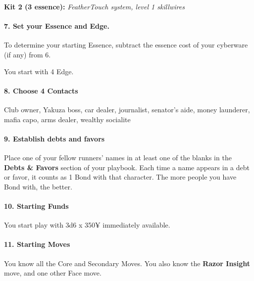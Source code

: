 \begin{multicols}{3}
\textbf{Kit 2 (3 essence):} \textit{FeatherTouch system, level
1 skillwires}


\paragraph{7.  Set your Essence and Edge.}

To determine your starting Essence, subtract the
essence cost of your cyberware (if any) from 6.

You start with 4 Edge.

\paragraph{8.  Choose 4 Contacts}

Club owner, Yakuza boss, car dealer, journalist,
senator’s aide, money launderer, mafia capo,
arms dealer, wealthy socialite


\paragraph{9.  Establish debts and favors}

Place one of your fellow runners’ names in at
least one of the blanks in the \textbf{Debts \& Favors}
section of your playbook. Each time a name
appears in a debt or favor, it counts as 1 Bond
with that character. The more people you have
Bond with, the better.

\paragraph{10.  Starting Funds}

You start play with 3d6 x 350¥ immediately
available.

\paragraph{11.  Starting Moves}

You know all the Core and Secondary Moves.
You also know the \textbf{Razor Insight} move, and
one other Face move.

\end{multicols}

\newpage

